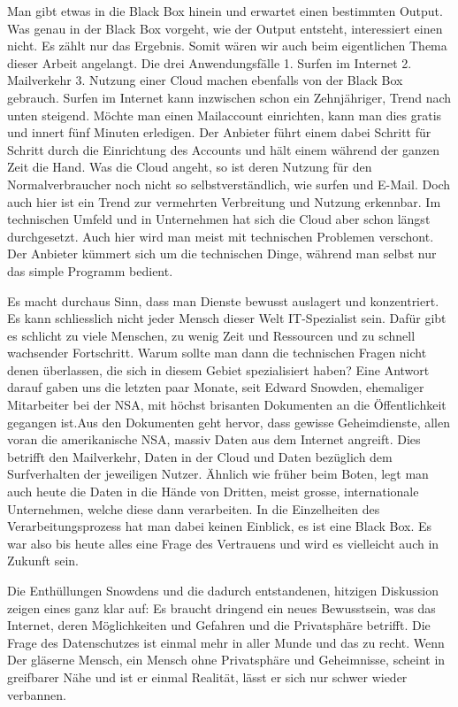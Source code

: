 Man gibt etwas in die Black Box hinein und erwartet einen bestimmten Output. Was genau in der Black Box vorgeht, wie der Output entsteht, interessiert einen nicht. Es zählt nur das Ergebnis. Somit wären wir auch beim eigentlichen Thema dieser Arbeit angelangt. Die drei Anwendungsfälle
1. Surfen im Internet
2. Mailverkehr
3. Nutzung einer Cloud
machen ebenfalls von der Black Box gebrauch. Surfen im Internet kann inzwischen schon ein Zehnjähriger, Trend nach unten steigend. Möchte man einen Mailaccount einrichten, kann man dies gratis und innert fünf Minuten erledigen. Der Anbieter führt einem dabei Schritt für Schritt durch die Einrichtung des Accounts und hält einem während der ganzen Zeit die Hand. Was die Cloud angeht, so ist deren Nutzung für den Normalverbraucher noch nicht so selbstverständlich, wie surfen und E-Mail. Doch auch hier ist ein Trend zur vermehrten Verbreitung und Nutzung erkennbar. Im technischen Umfeld und in Unternehmen hat sich die Cloud aber schon längst durchgesetzt. Auch hier wird man meist mit technischen Problemen verschont. Der Anbieter kümmert sich um die technischen Dinge, während man selbst nur das simple Programm bedient.

Es macht durchaus Sinn, dass man Dienste bewusst auslagert und konzentriert. Es kann schliesslich nicht jeder Mensch dieser Welt IT-Spezialist sein. Dafür gibt es schlicht zu viele Menschen, zu wenig Zeit und Ressourcen und zu schnell wachsender Fortschritt. Warum sollte man dann die technischen Fragen nicht denen überlassen, die sich in diesem Gebiet spezialisiert haben? Eine Antwort darauf gaben uns die letzten paar Monate, seit Edward Snowden, ehemaliger Mitarbeiter bei der NSA, mit höchst brisanten Dokumenten an die Öffentlichkeit gegangen ist.Aus den Dokumenten geht hervor, dass gewisse Geheimdienste, allen voran die amerikanische NSA, massiv Daten aus dem Internet angreift. Dies betrifft den Mailverkehr, Daten in der Cloud und Daten bezüglich dem Surfverhalten der jeweiligen Nutzer. Ähnlich wie früher beim Boten, legt man auch heute die Daten in die Hände von Dritten, meist grosse, internationale Unternehmen, welche diese dann verarbeiten. In die Einzelheiten des Verarbeitungsprozess hat man dabei keinen Einblick, es ist eine Black Box. Es war also bis heute alles eine Frage des Vertrauens und wird es vielleicht auch in Zukunft sein.

Die Enthüllungen Snowdens und die dadurch entstandenen, hitzigen Diskussion zeigen eines ganz klar auf: Es braucht dringend ein neues Bewusstsein, was das Internet, deren Möglichkeiten und Gefahren und die Privatsphäre betrifft. Die Frage des Datenschutzes ist einmal mehr in aller Munde und das zu recht. Wenn  Der gläserne Mensch, ein Mensch ohne Privatsphäre und Geheimnisse, scheint in greifbarer Nähe und ist er einmal Realität, lässt er sich nur schwer wieder verbannen.


